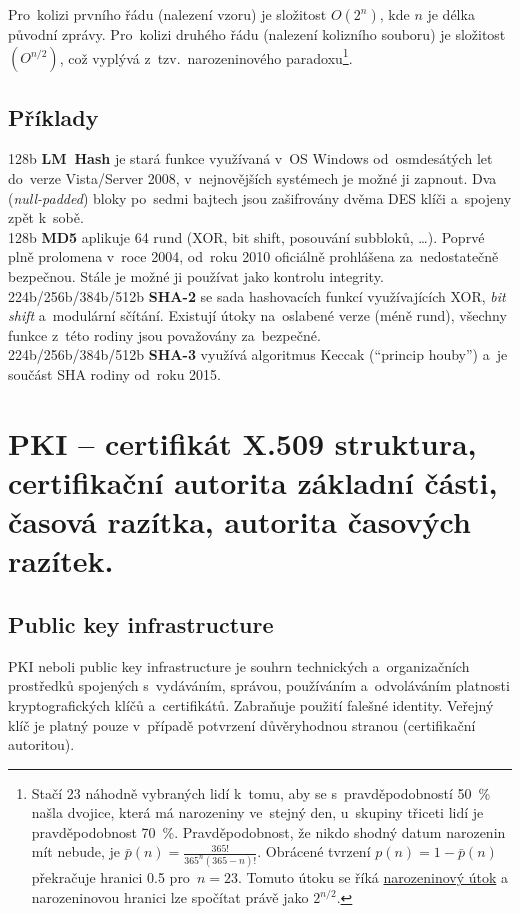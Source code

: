 Pro~kolizi prvního řádu (nalezení vzoru) je složitost $O(2^n)$, kde $n$ je délka původní zprávy. Pro~kolizi druhého řádu (nalezení kolizního souboru) je složitost $(O^{n/2})$, což vyplývá z~tzv.~narozeninového paradoxu\footnote{
Stačí 23 náhodně vybraných lidí k~tomu, aby se s~pravděpodobností 50~\% našla dvojice, která má narozeniny ve~stejný den, u~skupiny třiceti lidí je pravděpodobnost 70~\%. Pravděpodobnost, že nikdo shodný datum narozenin mít nebude, je $\bar{p}(n) = \frac{365!}{365^n(365 - n)!}$. Obrácené tvrzení $p(n) = 1 - \bar{p}(n)$ překračuje hranici 0.5 pro~$n=23$.
Tomuto útoku se říká \href{https://en.wikipedia.org/wiki/Birthday_attack}{narozeninový útok} a narozeninovou hranici lze spočítat právě jako $2^{n/2}$.
}.

\subsection{Příklady}

128b \textbf{LM~Hash} je stará funkce využívaná v~OS Windows od~osmdesátých let do~verze Vista/Server 2008, v~nejnovějších systémech je možné ji zapnout. Dva (\emph{null-padded}) bloky po~sedmi bajtech jsou zašifrovány dvěma DES klíči a~spojeny zpět k~sobě. \\
128b \textbf{MD5} aplikuje 64 rund (XOR, bit shift, posouvání subbloků, \dots). Poprvé plně prolomena v~roce 2004, od~roku 2010 oficiálně prohlášena za~nedostatečně bezpečnou. Stále je možné ji používat jako kontrolu integrity. \\
224b/256b/384b/512b \textbf{SHA-2} se sada hashovacích funkcí využívajících XOR, \emph{bit shift} a~modulární sčítání. Existují útoky na~oslabené verze (méně rund), všechny funkce z~této rodiny jsou považovány za~bezpečné. \\
224b/256b/384b/512b \textbf{SHA-3} využívá algoritmus Keccak (\enquote{princip houby}) a~je součást SHA rodiny od~roku 2015.

\clearpage
\section{PKI -- certifikát X.509 struktura, certifikační autorita základní části, časová razítka, autorita časových razítek.}

\subsection{Public key infrastructure}

PKI neboli public key infrastructure je souhrn technických a~organizačních prostředků spojených s~vydáváním, správou, používáním a~odvoláváním platnosti kryptografických klíčů a~certifikátů. Zabraňuje použití falešné identity. Veřejný klíč je platný pouze v~případě potvrzení důvěryhodnou stranou (certifikační autoritou).

